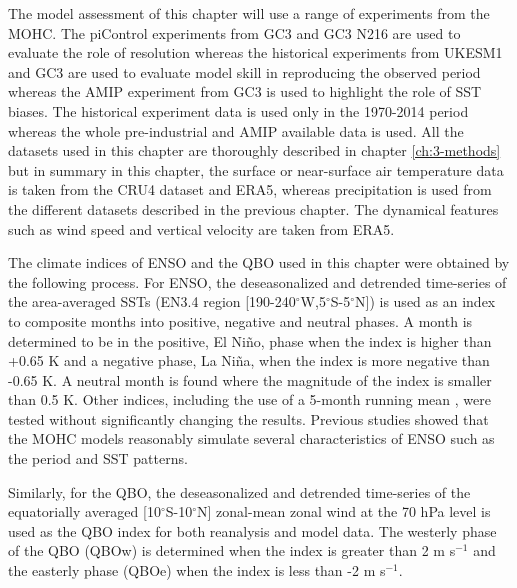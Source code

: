 The model assessment of this chapter will use a range of experiments from the MOHC. The piControl experiments from GC3 and GC3 N216 are used to evaluate the role of resolution whereas the historical experiments from UKESM1 and GC3 are used to evaluate model skill in reproducing the observed period whereas the AMIP experiment from GC3 is used to highlight the role of SST biases. The historical experiment data is used only in the 1970-2014 period whereas the whole pre-industrial and AMIP available data is used. 
All the datasets used in this chapter are thoroughly described in chapter \ref{ch:3-methods} but in summary in this chapter, the surface or near-surface air temperature data is taken from the CRU4 dataset and ERA5, whereas precipitation is used from the different datasets described in the previous chapter. The dynamical features such as wind speed and vertical velocity are taken from ERA5.

The climate indices of ENSO and the QBO used in this chapter were obtained by the following process. 
For ENSO, the deseasonalized and detrended time-series of the area-averaged SSTs (EN3.4 region [190-240$^\circ$W,5$^\circ$S-5$^\circ$N]) is used as an index to composite months into positive, negative and neutral phases. 
A month is determined to be in the positive, El Niño, phase when the index is higher than +0.65 K and a negative phase, La Niña, when the index is more negative than -0.65 K. A neutral month is found where the magnitude of the index is smaller than 0.5 K.  Other indices, including the use of a 5-month running mean \citep{trenberth1998}, were tested without significantly changing the results.   Previous studies \citep[e.g.][]{menary2018,kuhlbrodt2018}  showed that the MOHC models reasonably simulate several characteristics of ENSO such as the period and SST patterns.

Similarly, for the QBO, the deseasonalized and detrended time-series of the equatorially averaged [10$^\circ$S-10$^\circ$N] zonal-mean zonal wind at the 70 hPa level is used as the QBO index for both reanalysis and model data. The westerly phase of the QBO (QBOw) is determined when the index is greater than 2 m s$^{-1}$ and the easterly phase (QBOe) when the index is less than -2 m s$^{-1}$. 



